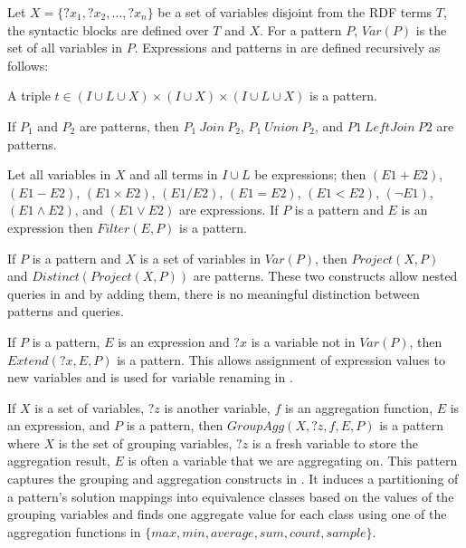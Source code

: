 Let $X = \{?x_1, ?x_2, \ldots, ?x_n\}$ be a set of variables disjoint from the RDF terms $T$, the \sparql syntactic blocks are defined over $T$ and $X$. For a pattern $P$, $Var(P)$ is the set of all variables in $P$.
Expressions and patterns in are defined recursively as follows:
\squishlist
    \item A triple $ t \in (I \cup L \cup X) \times (I \cup X) \times (I \cup L \cup X)$ is a pattern.
    \item If $P_1$ and $P_2$ are patterns, then $ P_1\ Join\ P_2$, $ P_1\ Union\ P_2$, and  $P1\ LeftJoin\ P2$ are patterns. %
    \item Let all variables in $X$ and all terms in $I \cup L$ be \sparql expressions; then $ (E1+E2)$, $(E1-E2)$, $(E1\times E2)$, $ (E1/E2)$, $(E1=E2)$, $(E1<E2)$, $(\neg E1)$, $(E1\land E2)$, and $(E1\lor E2)$ are expressions. If $P$ is a pattern and $E$ is an expression then $Filter (E, P)$ is a pattern.
    \begin{sloppypar}
    \item If $P$ is a pattern and $X$ is a set of variables in $Var(P)$, then $Project (X, P)$ and $Distinct(Project(X, P))$ are patterns. These two constructs allow nested queries in \sparql and by adding them, there is no meaningful distinction between \sparql patterns and queries. %
    \end{sloppypar}
    \item If $P$ is a pattern, $E$ is an expression and $?x$ is a variable not in $Var(P)$, then $Extend(?x, E, P)$ is a pattern. This allows assignment of expression values to new variables and is used for variable renaming in \rdfframes.
    \begin{sloppypar}    
    \item If $X$ is a set of variables, $?z$ is another variable, $f$ is an aggregation function, $E$ is an expression, and $P$ is a pattern, then $GroupAgg(X,?z,f,E,P)$ is a pattern where $X$ is the set of grouping variables, $?z$ is a fresh variable to store the aggregation result, $E$ is often a variable that we are aggregating on. This pattern captures the grouping and aggregation constructs in . It induces a partitioning of a pattern's solution mappings into equivalence classes based on the values of the grouping variables and finds one aggregate value for each class using one of the aggregation functions in %
    $\{max, min, average, sum, count, sample\}$.
    \end{sloppypar}

